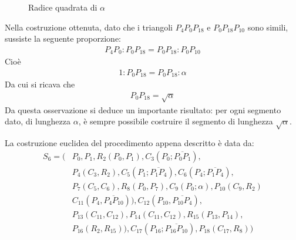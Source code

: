 \begin{figure}[!h]
\begin{center}
\caption{Radice quadrata di $\alpha$}
\end{center}
\end{figure}


\noindent 
Nella costruzione ottenuta, dato che i triangoli $ P_{4}P_{0} P_{18}$ e $P_{0} P_{18} P_{10}$ sono simili, sussiste la seguente proporzione:
\begin{align*}
P_{4} P_{0} : P_{0} P_{18} = P_{0}P_{18} :P_{0}P_{10}
\end{align*}
Cioè
\begin{align*}
1 : P_{0}P_{18} = P_{0}P_{18} : \alpha
\end{align*}
Da cui si ricava che 
\begin{align*}
P_{0} P_{18} = \sqrt{ \alpha}
\end{align*}
Da questa osservazione si deduce un importante risultato: per ogni segmento dato, di lunghezza $\alpha$, è sempre possibile costruire il segmento di lunghezza $\sqrt{ \alpha}$. 

La costruzione euclidea del procedimento appena descritto è data da:
\begin{align*}
S_{6} = ( &P_{0}, P_{1}, R_{2}(P_{0}, P_{1}), C_{3}(P_{0};\overline{P_{0} P_{1}}), \\
&P_{4}(C_{3}, R_{2} ), C_{5}(P_{1};\overline{P_{1} P_{4}}), C_{6}(P_{4};\overline{P_{1} P_{4}}),\\
&P_{7}(C_{5}, C_{6} ), R_{8}(P_{0}, P_{7}), C_{9}(P_{0}; \alpha ), P_{10}(C_{9}, R_{2} ) \\
&C_{11}(P_{4}, \overline{P_{4} P_{10}}) ), C_{12}(P_{10}, \overline{P_{10} P_{4}}), \\
&P_{13}(C_{11},C_{12}), P_{14}(C_{11},C_{12}),   R_{15}(P_{13}, P_{14}), \\
&P_{16}(R_{2},R_{15}) ), C_{17}(P_{16};\overline{P_{16} P_{10}}), P_{18}(C_{17}, R_{8} ) )
\end{align*}




